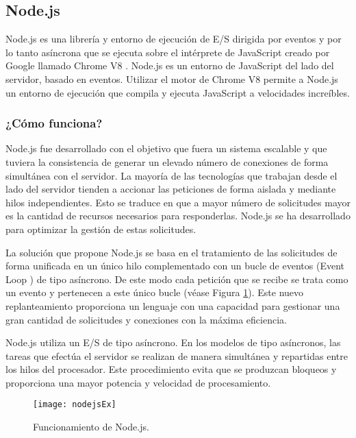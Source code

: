 \subsection{Node.js}

Node.js \cite{URL::Nodejs} es una librería y entorno de ejecución de E/S dirigida por eventos y por lo tanto asíncrona que se ejecuta sobre el intérprete de JavaScript creado por Google llamado Chrome V8 \cite{URL::ChromeV8}. Node.js es un entorno de JavaScript del lado del servidor, basado en eventos. Utilizar el motor de Chrome V8 permite a Node.js un entorno de ejecución que compila y ejecuta JavaScript a velocidades increíbles.

\subsubsection{¿Cómo funciona?}

Node.js fue desarrollado con el objetivo que fuera un sistema escalable y que tuviera la consistencia de generar un elevado número de conexiones de forma simultánea con el servidor. La mayoría de las tecnologías que trabajan desde el lado del servidor tienden a accionar las peticiones de forma aislada y mediante hilos independientes. Esto se traduce en que a mayor número de solicitudes mayor es la cantidad de recursos necesarios para responderlas. Node.js se ha desarrollado para optimizar la gestión de estas solicitudes.

La solución que propone Node.js se basa en el tratamiento de las solicitudes de forma unificada en un único hilo complementado con un bucle de eventos   (Event Loop \cite{URL::EventLoop}) de tipo asíncrono. De este modo cada petición que se recibe se trata como un evento y pertenecen a este único bucle (véase Figura \ref{fig:nodejsEx}). Este nuevo replanteamiento proporciona un lenguaje con una capacidad para gestionar una gran cantidad de solicitudes y conexiones con la máxima eficiencia.

Node.js utiliza un E/S de tipo asíncrono. En los modelos de tipo asíncronos, las tareas que efectúa el servidor se realizan de manera simultánea y repartidas entre los hilos del procesador. Este procedimiento evita que se produzcan bloqueos y proporciona una mayor potencia y velocidad de procesamiento.

     
\begin{figure}[h]
    \centering
    \texttt{[image: nodejsEx]}
    \caption{Funcionamiento de Node.js.}
    \label{fig:nodejsEx}
\end{figure}


